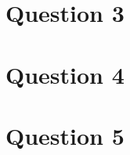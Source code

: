 \documentclass[a4paper, 11pt]{article}
\begin{document}
\newpage
\section*{Question 3}

\section*{Question 4}

\section*{Question 5}
\end{document}
